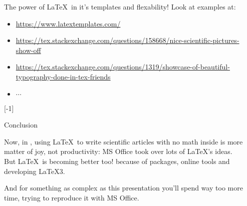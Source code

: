 \begin{frame}[t]{The power of \LaTeX\ in it's templates and flexability!}\relax
\vspace{-1ex}
     Look at examples at:
     \begin{itemize}
         \item \url{https://www.latextemplates.com/}
         \item \url{https://tex.stackexchange.com/questions/158668/nice-scientific-pictures-show-off}
         \item \url{https://tex.stackexchange.com/questions/1319/showcase-of-beautiful-typography-done-in-tex-friends}
        \item $\cdots$
     \end{itemize}
     
     \vspace{-1ex}
[-1]
     
\end{frame}

\begin{frame}{Conclusion}\relax 

Now, in \the\year , using \LaTeX\ to write scientific articles with no math inside is more matter of joy, not productivity: MS Office took over lots of \LaTeX 's ideas.\\[2ex]

But \LaTeX\ is becoming better too! because of packages, online tools and developing \LaTeX 3.

And for something as complex as this presentation you'll spend way too more time, trying to reproduce it with MS Office.
     
\end{frame}

